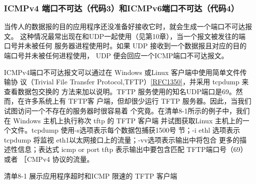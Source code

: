 \subsubsection{ICMPv4 端口不可达（代码3）和ICMPv6端口不可达（代码4）}
当传人的数据报的目的应用程序还没准备好接收它时，就会生成一个端口不可达报文。
这种情况最常出现在和UDP一起使用（见第10章），当一个报文被发往的端口号并未被任何
服务器进程使用时。如果 UDP 接收到一个数据报且对应的目的端口号并未被任何进程使用，
UDP 便会回应一个ICMP端口不可达报文。

ICMPv4端口不可达报文可以通过在 Windows 或Linux 客户端中使用简单文件传输协
议（Trivial File Transfer Protocol,TFTP）\href{https://www.rfc-editor.org/rfc/rfc1350}{[RFC1350]}，并采用 tcpdump 来查看数据包交换的
方法来加以说明。TFTP 服务使用的知名UDP端口是69。然而，在许多系统上有 TFTP客
户端，但却很少运行 TFTP 服务器。因此，当我们试图访问一个不存在的服务器时很容易着
个究竟。在清单8-1所示的例子中，我们在 Windows 主机上执行称次 tftp 的 TFTP 客户端
并试图获取Linux 主机上的一个文件。tcpdump 使用-s选项表示每个数据包捕获1500号
节；-i ethl 选项表示 tcpdump 将监视 eth1以太网接口上的流量；-vv选项表示输出中将包合
更多的描述性信息；表达式 icmp or port tftp 表示输出中要包含匹配 TFTP端口号（69）或者
［CMPv4 协议的流量。

清单8-1 展示应用程序超时和ICMP 限速的 TFTP 客户端

